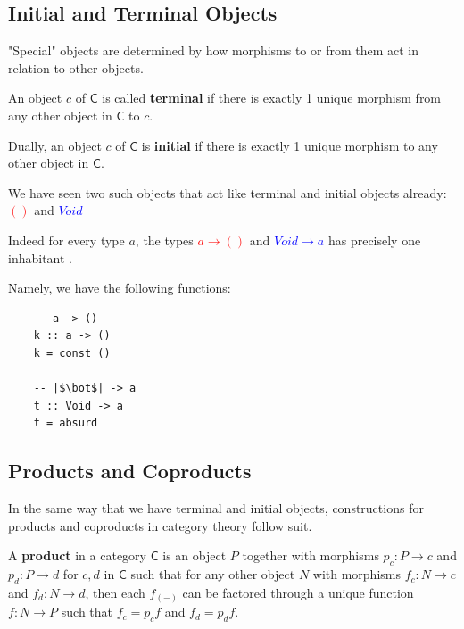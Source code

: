 \documentclass[tikz]{beamer}
\newcommand{\cat}[1]{\bm{ \mathsf{#1} }}
\newcommand{\cc}{\cat{C}}
\newcommand{\mred}[1]{\textcolor{red}{$#1$}}
\newcommand{\mblue}[1]{\textcolor{blue}{$#1$}}
\theoremstyle{definition}
\begin{document}
\subsection{Initial and Terminal Objects}

\frame
{
	"Special" objects are determined by how morphisms to or from them act in relation to other objects. 
}

\frame
{
	\begin{definition}
		An object $c$ of $\cc$ is called \textbf{terminal} if there is exactly 1 unique morphism from any other object in $\cc$ to $c$. 
		
		Dually,  an object $c$ of $\cc$ is \textbf{initial} if there is exactly 1 unique morphism to any other object in $\cc$. 
	\end{definition}
}

\frame
{
	We have seen two such objects that act like terminal and initial objects already: \mred{()} and \mblue{Void}
}

\frame
{
	Indeed for every type $a$, the types \mred{a \to ()} and \mblue{Void \to a} has precisely one inhabitant . 
}

\begin{frame}[fragile]

Namely, we have the following functions: 

	\begin{verbatim}
	-- a -> ()
	k :: a -> ()
	k = const ()
	
	-- |$\bot$| -> a
	t :: Void -> a
	t = absurd
	\end{verbatim}
\end{frame}

\subsection{Products and Coproducts}

\frame
{

	In the same way that we have terminal and initial objects, constructions for products and coproducts in category theory follow suit.
}

\frame
{
	\begin{definition}[Product]
	
		A \textbf{product} in a category $\cc$ is an object $P$ together with morphisms $p_c : P \to c$ and $p_d : P \to d$ for $c,d$ in $\cc$ such that for any other object $N$ with morphisms $f_c : N \to c$ and $f_d : N \to d$, then each $f_{(-)}$ can be factored through a unique function $f : N \to P$ such that $f_c = p_cf$ and $f_d = p_df$. 
	\end{definition}
}
\end{document}
